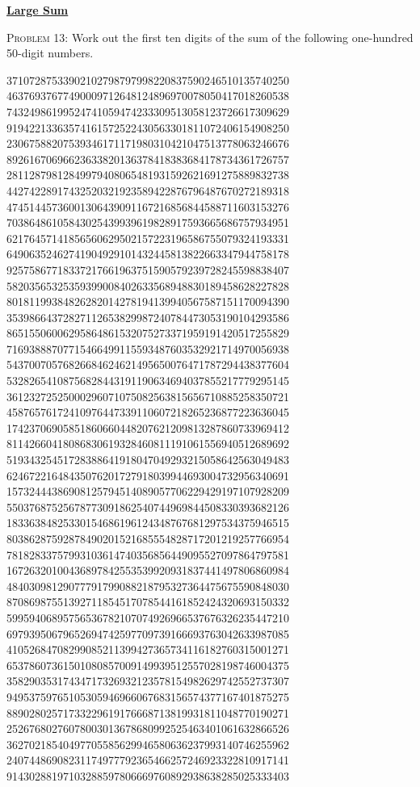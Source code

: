 \documentclass[11pt]{article}
\begin{document}
\par\bigskip\noindent
\href{https://projecteuler.net/problem=13}{\textbf{Large Sum}}\par\noindent
\textsc{Problem 13:}
Work out the first ten digits of the sum of the following one-hundred 50-digit numbers.
{\tiny
\begin{verbatim*}
37107287533902102798797998220837590246510135740250
46376937677490009712648124896970078050417018260538
74324986199524741059474233309513058123726617309629
91942213363574161572522430563301811072406154908250
23067588207539346171171980310421047513778063246676
89261670696623633820136378418383684178734361726757
28112879812849979408065481931592621691275889832738
44274228917432520321923589422876796487670272189318
47451445736001306439091167216856844588711603153276
70386486105843025439939619828917593665686757934951
62176457141856560629502157223196586755079324193331
64906352462741904929101432445813822663347944758178
92575867718337217661963751590579239728245598838407
58203565325359399008402633568948830189458628227828
80181199384826282014278194139940567587151170094390
35398664372827112653829987240784473053190104293586
86515506006295864861532075273371959191420517255829
71693888707715466499115593487603532921714970056938
54370070576826684624621495650076471787294438377604
53282654108756828443191190634694037855217779295145
36123272525000296071075082563815656710885258350721
45876576172410976447339110607218265236877223636045
17423706905851860660448207621209813287860733969412
81142660418086830619328460811191061556940512689692
51934325451728388641918047049293215058642563049483
62467221648435076201727918039944693004732956340691
15732444386908125794514089057706229429197107928209
55037687525678773091862540744969844508330393682126
18336384825330154686196124348767681297534375946515
80386287592878490201521685554828717201219257766954
78182833757993103614740356856449095527097864797581
16726320100436897842553539920931837441497806860984
48403098129077791799088218795327364475675590848030
87086987551392711854517078544161852424320693150332
59959406895756536782107074926966537676326235447210
69793950679652694742597709739166693763042633987085
41052684708299085211399427365734116182760315001271
65378607361501080857009149939512557028198746004375
35829035317434717326932123578154982629742552737307
94953759765105305946966067683156574377167401875275
88902802571733229619176668713819931811048770190271
25267680276078003013678680992525463401061632866526
36270218540497705585629946580636237993140746255962
24074486908231174977792365466257246923322810917141
91430288197103288597806669760892938638285025333403

\end{verbatim*}}
\end{document}
